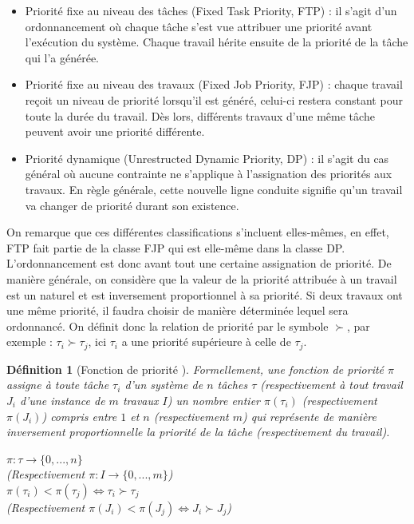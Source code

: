 \documentclass[11pt,a4paper,oneside]{book}
\theoremstyle{break}
\newtheorem{defin}{Définition}
\theoremstyle{breakplain}
\begin{document}
\begin{itemize}
\item Priorité fixe au niveau des tâches (Fixed Task Priority, FTP) : il s'agit d'un ordonnancement où chaque tâche s'est vue attribuer une priorité avant l'exécution du système. Chaque travail hérite ensuite de la priorité de la tâche qui l'a générée.
\item Priorité fixe au niveau des travaux (Fixed Job Priority, FJP) : chaque travail reçoit un niveau de priorité lorsqu'il est généré, celui-ci restera constant pour toute la durée du travail. Dès lors, différents travaux d'une même tâche peuvent avoir une priorité différente.
\item Priorité dynamique (Unrestructed Dynamic Priority, DP) : il s'agit du cas général où aucune contrainte ne s'applique à l'assignation des priorités aux travaux. En règle générale, cette nouvelle ligne conduite signifie qu'un travail va changer de priorité durant son existence.\\
\end{itemize}
On remarque que ces différentes classifications s'incluent elles-mêmes, en effet, FTP fait partie de la classe FJP qui est elle-même dans la classe DP.\\

L'ordonnancement est donc avant tout une certaine assignation de priorité. De manière générale, on considère que la valeur de la priorité attribuée à un travail est un naturel et est inversement proportionnel à sa priorité. Si deux travaux ont une même priorité, il faudra choisir de manière déterminée lequel sera ordonnancé. On définit donc la relation de priorité par le symbole $\succ$, par exemple : $\tau_i \succ \tau_j$, ici $\tau_i$ a une priorité supérieure à celle de $\tau_j$.\\

\begin{defin}[Fonction de priorité \cite{santy2012ordonnancement}]
Formellement, une fonction de priorité $\pi$ assigne à toute tâche $\tau_i$ d'un système de $n$ tâches $\tau$ (respectivement à tout travail $J_i$ d'une instance de $m$ travaux $I$) un nombre entier $\pi(\tau_i)$ (respectivement $\pi(J_i)$) compris entre $1$ et $n$ (respectivement $m$) qui représente de manière inversement proportionnelle la priorité de la tâche (respectivement du travail).
\begin{center}
$\pi : \tau \rightarrow \{0,...,n \}$\\
(Respectivement $\pi : I \rightarrow \{0,...,m \}$)\\
$\pi(\tau_i) < \pi(\tau_j) \Leftrightarrow \tau_i \succ \tau_j$\\
(Respectivement $\pi(J_i) < \pi(J_j) \Leftrightarrow J_i \succ J_j$)
\end{center}
\end{defin}
\end{document}
